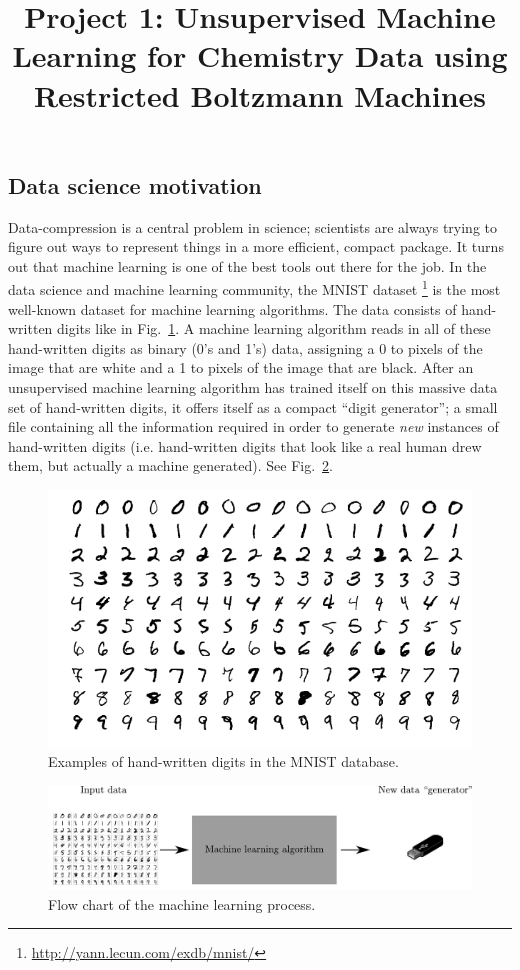 \documentclass[12pt]{article}
\title{Project 1: Unsupervised Machine Learning for Chemistry Data using Restricted Boltzmann Machines}
\date{}
\begin{document}
\maketitle

\subsection*{Data science motivation}

Data-compression is a central problem in science; scientists are always trying to figure out ways to represent things in a more efficient, compact package. 
It turns out that machine learning is one of the best tools out there for the job.
In the data science and machine learning community, the MNIST dataset
\footnote{ \href{http://yann.lecun.com/exdb/mnist/}{http://yann.lecun.com/exdb/mnist/}}
is the most well-known dataset for machine learning algorithms. 
The data consists of hand-written digits like in Fig.~\ref{fig:MNIST_digits}. 
A machine learning algorithm reads in all of these hand-written digits as binary (0's and 1's) data, assigning a 0 to pixels of the image that are white and a 1 to pixels of the image that are black. 
After an unsupervised machine learning algorithm has trained itself on this massive data set of hand-written digits, it offers itself as a compact ``digit generator''; a small file containing all the information required in order to generate \textit{new} instances of hand-written digits (i.e. hand-written digits that look like a real human drew them, but actually a machine generated). See Fig.~\ref{fig:MNIST_ML}. 

\begin{figure}
    \begin{center}
        \includegraphics[width=0.5\linewidth]{../../figures/MnistExamples.png}
    \end{center}
    \caption{Examples of hand-written digits in the MNIST database.}
    \label{fig:MNIST_digits}
\end{figure}

\begin{figure}
    \begin{center}
        \includegraphics[width=\linewidth]{../../figures/MNIST_ML.pdf}
    \end{center}
    \caption{Flow chart of the machine learning process.}
    \label{fig:MNIST_ML}
\end{figure}
\end{document}
